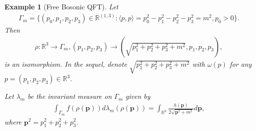 \documentclass[a4paper,10pt]{amsart}
\newtheorem{example}{Example}[section]
\newcommand{\R}{\mathbb R}  %
\begin{document}
\begin{example}[Free Bosonic QFT]
    Let
    \begin{align*}
        \Gamma_m = \{(p_0, p_1, p_2, p_3) \in \R^{(1,3)} : 
            \langle p, p \rangle = p_{0}^2 - p_{1}^{2} - p_{2}^{2}
        -p_{3}^{2} = m^2, p_{0} > 0 \}.
    \end{align*}
    Then
    \begin{align*}
        \rho: \R^{3} \to \Gamma_{m}, (p_1, p_2, p_3) \to
        (\sqrt{p_{1}^{2} + p_{2}^{2}+ p_{3}^{2} + m^{2}}, p_1, p_2, p_3), 
    \end{align*}
    is an isomorphism.
    In the sequel, denote $\sqrt{p_{1}^{2} + p_{2}^{2}+ p_{3}^{2} + m^{2}}$
    with $\omega(p)$ for any $p = (p_1, p_2, p_3) \in \R^{3}$.
      
    Let $\lambda_m$ be the invariant measure on $\Gamma_m$ given by
    \begin{align*}
        \int_{\Gamma_m} f(\rho(\mathbf{p})) d\lambda_m(\rho(\mathbf{p})) 
        = \int_{\R^{3}}\frac{h(\mathbf{p})}
        {2\sqrt{\mathbf{p}^2 + m^2}}d\mathbf{p},
    \end{align*}
    where $\mathbf{p}^2 = p_{1}^{2} + p^{2}_{2} + p^{2}_{3}$.


\end{example}
\end{document}
